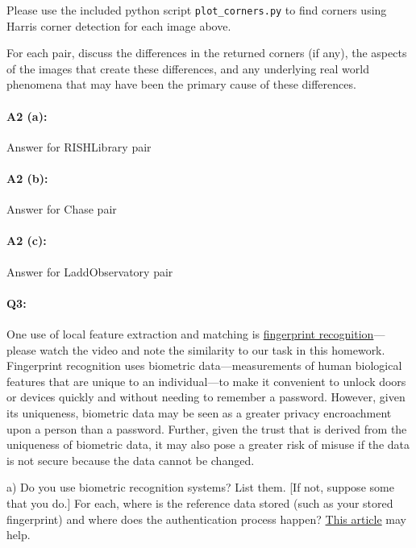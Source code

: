 Please use the included python script \texttt{plot\_corners.py} to find corners using Harris corner detection for each image above.

For each pair, discuss the differences in the returned corners (if any), the aspects of the images that create these differences, and any underlying real world phenomena that may have been the primary cause of these differences.


\paragraph{A2 (a):} Answer for RISHLibrary pair



\pagebreak
\paragraph{A2 (b):} Answer for Chase pair



\pagebreak
\paragraph{A2 (c):} Answer for LaddObservatory pair




\pagebreak
\paragraph{Q3:} One use of local feature extraction and matching is \href{https://www.youtube.com/watch?v=xD88Qs_DZp4}{fingerprint recognition}---please watch the video and note the similarity to our task in this homework. Fingerprint recognition uses biometric data---measurements of human biological features that are unique to an individual---to make it convenient to unlock doors or devices quickly and without needing to remember a password. However, given its uniqueness, biometric data may be seen as a greater privacy encroachment upon a person than a password. Further, given the trust that is derived from the uniqueness of biometric data, it may also pose a greater risk of misuse if the data is not secure because the data cannot be changed.

a) Do you use biometric recognition systems? List them. [If not, suppose some that you do.]
For each, where is the reference data stored (such as your stored fingerprint) and where does the authentication process happen? \href{https://ievoreader.com/how-biometric-data-is-stored/}{This article} may help.

